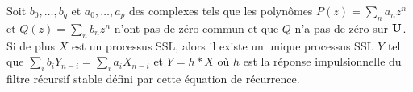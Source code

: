 	\begin{pop}
		Soit $b_0,\ldots,b_q$ et $a_0,\ldots,a_p$ des complexes tels que les polynômes $P(z) = \sum_n a_n z^n$ et $Q(z) = \sum_n b_n z^n$ n'ont pas de zéro commun et que $Q$ n'a pas de zéro sur $\mathbf{U}$.
		Si de plus $X$ est un processus SSL, alors il existe un unique processus SSL $Y$ tel que $\sum_i b_i Y_{n - i} = \sum_i a_i X_{n - i}$ et $Y = h * X$ où $h$ est la réponse impulsionnelle du filtre récursif stable défini par cette équation de récurrence.
	\end{pop}